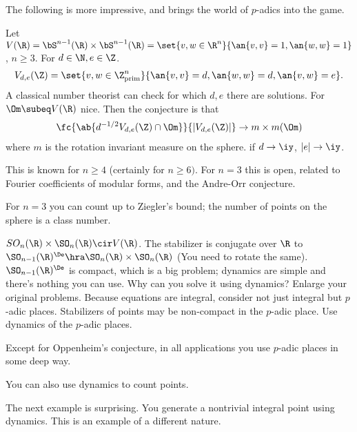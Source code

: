 The following is more impressive, and brings the world of $p$-adics into the game.
\begin{ex}
Let $V(\R) = \bS^{n-1}(\R)\times \bS^{n-1}(\R) = \set{v,w\in \R^n}{\an{v,v}=1,\an{w,w}=1} $, $n\ge 3$. 
For $d\in \N, e\in \Z$. 
\begin{align}
V_{d,e}(\Z) = \set{v,w\in \Z_{\text{prim}}^n}{\an{v,v}=d,\an{w,w}=d,\an{v,w}=e}.
\end{align}
A classical number theorist can check for which $d,e$ there are solutions. 
For $\Om\subeq V(\R)$ nice. Then the conjecture is that
\begin{align}
\fc{\ab{d^{-1/2} V_{d,e}(\Z)\cap \Om}}{|V_{d,e}(\Z)|} \to m\times m(\Om)
\end{align}
where $m$ is the rotation invariant measure on the sphere.
if $d\to \iy$, $|e|\to \iy$. 

This is known for $n\ge 4$ (certainly for $n\ge 6)$. For $n=3$ this is open, related to Fourier coefficients of modular forms, and the Andre-Orr conjecture.
\end{ex}
For $n=3$ you can count up to Ziegler's bound; the  number of points on the sphere is a class number.

$SO_n(\R) \times \SO_n(\R)\cir V(\R)$.  The stabilizer is conjugate  over $\R$ to $\SO_{n-1}(\R)^\De\hra \SO_n(\R) \times \SO_n(\R)$ (You need to rotate the same).
$\SO_{n-1}(\R)^\De$ is compact, which is a big problem; dynamics are simple and there's nothing you can use. Why can you solve it using dynamics? Enlarge your original problems. Because equations are integral, consider not just integral but $p$-adic places. Stabilizers of points may be non-compact in the $p$-adic place. Use dynamics of the $p$-adic places.

Except for Oppenheim's conjecture, in all applications you use $p$-adic places in some deep way.

You can also use dynamics to count points. 

The next example is surprising. 
You generate a nontrivial integral point using dynamics. This is an example of a different nature.

